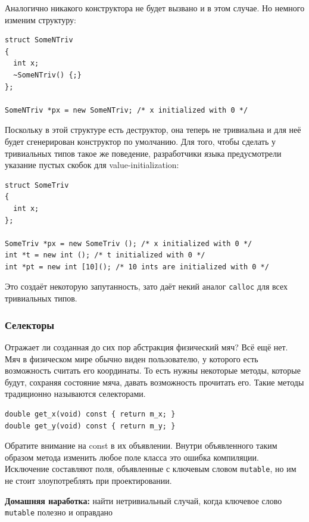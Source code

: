 \documentclass[a4paper,12pt,oneside]{article}
\begin{document}
Аналогично никакого конструктора не будет вызвано и в этом случае. Но немного изменим структуру:

\begin{lstlisting}
struct SomeNTriv
{
  int x;
  ~SomeNTriv() {;}
};

SomeNTriv *px = new SomeNTriv; /* x initialized with 0 */
\end{lstlisting}

Поскольку в этой структуре есть деструктор, она теперь не тривиальна и для неё будет сгенерирован конструктор по умолчанию. Для того, чтобы сделать у тривиальных типов такое же поведение, разработчики языка предусмотрели указание пустых скобок для value-initialization:

\begin{lstlisting}
struct SomeTriv
{
  int x;
};

SomeTriv *px = new SomeTriv (); /* x initialized with 0 */
int *t = new int (); /* t initialized with 0 */
int *pt = new int [10](); /* 10 ints are initialized with 0 */
\end{lstlisting}

Это создаёт некоторую запутанность, зато даёт некий аналог \lstinline!calloc! для всех тривиальных типов. 

\subsubsection{Селекторы}\label{Selectors}

Отражает ли созданная до сих пор абстракция физический мяч? Всё ещё нет. Мяч в физическом мире обычно виден пользователю, у которого есть возможность считать его координаты. То есть нужны некоторые методы, которые будут, сохраняя состояние мяча, давать возможность прочитать его. Такие методы традиционно называются селекторами.

\begin{lstlisting}
double get_x(void) const { return m_x; }
double get_y(void) const { return m_y; }
\end{lstlisting}

Обратите внимание на const в их объявлении. Внутри объявленного таким образом метода изменить любое поле класса это ошибка компиляции. Исключение составляют поля, объявленные с ключевым словом \lstinline!mutable!, но им не стоит злоупотреблять при проектировании.

\textbf{Домашняя наработка:} найти нетривиальный случай, когда ключевое слово \lstinline!mutable! полезно и оправдано
\end{document}
